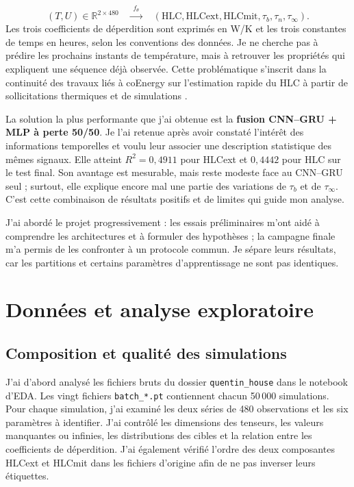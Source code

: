\documentclass[10pt,a4paper]{article}
\newcommand{\hlc}{\mathrm{HLC}}
\newcommand{\hlcext}{\mathrm{HLCext}}
\newcommand{\hlcmit}{\mathrm{HLCmit}}
\newcommand{\taub}{\tau_b}
\newcommand{\taun}{\tau_n}
\newcommand{\tauinf}{\tau_{\infty}}
\begin{document}
\begin{equation}
  (T,U)\in\mathbb{R}^{2\times480}
  \quad\xrightarrow{\;f_\theta\;}\quad
  (\hlc,\hlcext,\hlcmit,\taub,\taun,\tauinf).
  \label{eq:inverse}
\end{equation}
Les trois coefficients de déperdition sont exprimés en W/K et les trois constantes de temps en heures, selon les conventions des données. Je ne cherche pas à prédire les prochains instants de température, mais à retrouver les propriétés qui expliquent une séquence déjà observée. Cette problématique s'inscrit dans la continuité des travaux liés à coEnergy sur l'estimation rapide du HLC à partir de sollicitations thermiques et de simulations \cite{coenergy2026}.

La solution la plus performante que j'ai obtenue est la \textbf{fusion CNN--GRU + MLP à perte 50/50}. Je l'ai retenue après avoir constaté l'intérêt des informations temporelles et voulu leur associer une description statistique des mêmes signaux. Elle atteint $R^2=0{,}4911$ pour HLCext et $0{,}4442$ pour HLC sur le test final. Son avantage est mesurable, mais reste modeste face au CNN--GRU seul ; surtout, elle explique encore mal une partie des variations de $\tau_b$ et de $\tau_\infty$. C'est cette combinaison de résultats positifs et de limites qui guide mon analyse.

J'ai abordé le projet progressivement : les essais préliminaires m'ont aidé à comprendre les architectures et à formuler des hypothèses ; la campagne finale m'a permis de les confronter à un protocole commun. Je sépare leurs résultats, car les partitions et certains paramètres d'apprentissage ne sont pas identiques.

\section{Données et analyse exploratoire}

\subsection{Composition et qualité des simulations}
J'ai d'abord analysé les fichiers bruts du dossier \texttt{quentin\_house} dans le notebook d'EDA. Les vingt fichiers \texttt{batch\_*.pt} contiennent chacun 50\,000 simulations. Pour chaque simulation, j'ai examiné les deux séries de 480 observations et les six paramètres à identifier. J'ai contrôlé les dimensions des tenseurs, les valeurs manquantes ou infinies, les distributions des cibles et la relation entre les coefficients de déperdition. J'ai également vérifié l'ordre des deux composantes HLCext et HLCmit dans les fichiers d'origine afin de ne pas inverser leurs étiquettes.
\end{document}

